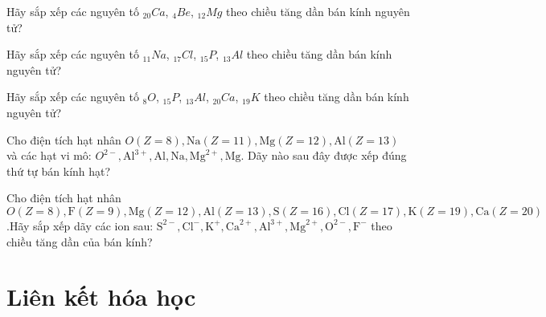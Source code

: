 \begin{vd}
	Hãy sắp xếp các nguyên tố $_{20}Ca$, $_{4}Be$, $_{12}Mg$ theo chiều tăng dần bán kính nguyên tử?
\end{vd}
\begin{vd}
	Hãy sắp xếp các nguyên tố $_{11}Na$, $_{17}Cl$, $_{15}P$, $_{13}Al$ theo chiều tăng dần bán kính nguyên tử?
	\sodongkevd[10]
\end{vd}
\begin{vd}
	Hãy sắp xếp các nguyên tố $_{8}O$, $_{15}P$, $_{13}Al$, $_{20}Ca$, $_{19}K$ theo chiều tăng dần bán kính nguyên tử?
	\sodongkevd[10]
\end{vd}
\begin{vd}
	Cho điện tích hạt nhân $O(Z=8), \mathrm{Na}(Z=11), \mathrm{Mg}(Z=12), \mathrm{Al}(Z=13)$ và các hạt vi mô: $O^{2-}, \mathrm{Al}^{3+}, \mathrm{Al}, \mathrm{Na}, \mathrm{Mg}^{2+}, \mathrm{Mg}$. Dãy nào sau đây được xếp đúng thứ tự bán kính hạt?
	\sodongkevd[15]
\end{vd}
\begin{vd}
	Cho điện tích hạt nhân $O(Z=8), \mathrm{F}(Z=9), \mathrm{Mg}(Z=12), \mathrm{Al}(Z=13),\mathrm{S}(Z=16),\mathrm{Cl}(Z=17),\mathrm{K}(Z=19),\mathrm{Ca}(Z=20)$.Hãy sắp xếp dãy các ion sau: $\mathrm{S}^{2-},\mathrm{Cl}^{-},\mathrm{K}^{+},\mathrm{Ca}^{2+},\mathrm{Al}^{3+},\mathrm{Mg}^{2+},\mathrm{O}^{2-},\mathrm{F}^{-} $ theo chiều tăng dần của bán kính?
	\sodongkevd[15]
\end{vd}
\chapter{Liên kết hóa học}
